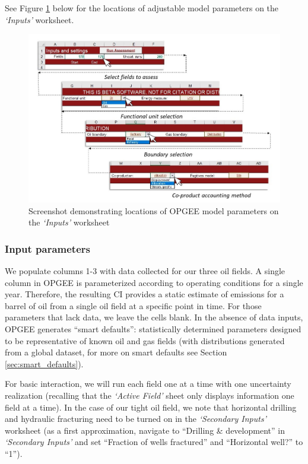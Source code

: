 \documentclass[11pt]{report}
\newcommand{\sheet}[1]{\textit{`{#1}'}}
\begin{document}
See Figure \ref{fig:lca_specs} below for the locations of adjustable model parameters on the \sheet{Inputs} worksheet.

\begin{figure}
\includegraphics[width=1\columnwidth]{documentation/images/User_Guide_figs/lcaspecs_2.jpg}
\caption{Screenshot demonstrating locations of OPGEE model parameters on the \sheet{Inputs} worksheet}
\label{fig:lca_specs}
\end{figure}

\subsubsection{Input parameters}

We populate columns 1-3 with data collected for our three oil fields. A single column in OPGEE is parameterized according to operating conditions for a single year. Therefore, the resulting CI provides a static estimate of emissions for a barrel of oil from a single oil field at a specific point in time. For those parameters that lack data, we leave the cells blank. In the absence of data inputs, OPGEE generates ``smart defaults'': statistically determined parameters designed to be representative of known oil and gas fields (with distributions generated from a global dataset, for more on smart defaults see Section \ref{sec:smart_defaults}). 

For basic interaction, we will run each field one at a time with one uncertainty realization (recalling that the \sheet{Active Field} sheet only displays information one field at a time). In the case of our tight oil field, we note that horizontal drilling and hydraulic fracturing need to be turned on in the \sheet{Secondary Inputs} worksheet (as a first approximation, navigate to ``Drilling \& development'' in \sheet{Secondary Inputs} and set ``Fraction of wells fractured'' and ``Horizontal well?'' to ``1'').
\end{document}
